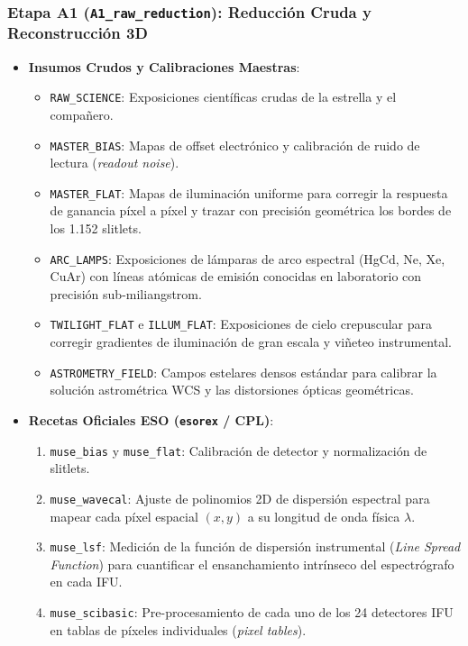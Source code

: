 \documentclass[11pt,a4paper]{article}
\begin{document}
\subsubsection{Etapa A1 (\texttt{A1\_raw\_reduction}): Reducción Cruda y Reconstrucción 3D}
\begin{itemize}[leftmargin=1.0cm]
    \item \textbf{Insumos Crudos y Calibraciones Maestras}:
    \begin{itemize}
        \item \texttt{RAW\_SCIENCE}: Exposiciones científicas crudas de la estrella y el compañero.
        \item \texttt{MASTER\_BIAS}: Mapas de offset electrónico y calibración de ruido de lectura (\textit{readout noise}).
        \item \texttt{MASTER\_FLAT}: Mapas de iluminación uniforme para corregir la respuesta de ganancia píxel a píxel y trazar con precisión geométrica los bordes de los 1.152 slitlets.
        \item \texttt{ARC\_LAMPS}: Exposiciones de lámparas de arco espectral (HgCd, Ne, Xe, CuAr) con líneas atómicas de emisión conocidas en laboratorio con precisión sub-miliangstrom.
        \item \texttt{TWILIGHT\_FLAT} e \texttt{ILLUM\_FLAT}: Exposiciones de cielo crepuscular para corregir gradientes de iluminación de gran escala y viñeteo instrumental.
        \item \texttt{ASTROMETRY\_FIELD}: Campos estelares densos estándar para calibrar la solución astrométrica WCS y las distorsiones ópticas geométricas.
    \end{itemize}
    \item \textbf{Recetas Oficiales ESO (\texttt{esorex} / CPL)}:
    \begin{enumerate}
        \item \texttt{muse\_bias} y \texttt{muse\_flat}: Calibración de detector y normalización de slitlets.
        \item \texttt{muse\_wavecal}: Ajuste de polinomios 2D de dispersión espectral para mapear cada píxel espacial $(x, y)$ a su longitud de onda física $\lambda$.
        \item \texttt{muse\_lsf}: Medición de la función de dispersión instrumental (\textit{Line Spread Function}) para cuantificar el ensanchamiento intrínseco del espectrógrafo en cada IFU.
        \item \texttt{muse\_scibasic}: Pre-procesamiento de cada uno de los 24 detectores IFU en tablas de píxeles individuales (\textit{pixel tables}).

\end{enumerate}
\end{itemize}
\end{document}
